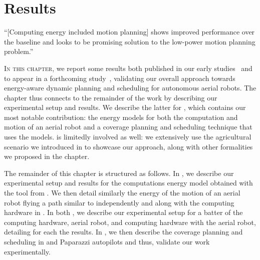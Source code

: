 
%
%
%
%
\chapter{Results}
\label{cp:res}

\begin{chapquote}{\cite{sudhakar2020balancing}}
  ``[Computing energy included motion planning] shows improved performance over the baseline and looks to be promising solution to the low-power motion planning problem.''
\end{chapquote}

\vspace*{1em}

\lettrine{I}{n this chapter}, we report some results both published in our early studies~\citep{seewald2019hlpgpu,seewald2019coarse,seewald2019component,seewald2020mechanical,zamanakos2020energy} and to appear in a forthcoming study~\citep{seewald202Xenergy}, validating our overall approach towards energy-aware dynamic planning and scheduling for autonomous aerial robots. The chapter thus connects to the remainder of the work by describing our experimental setup and results. We describe the latter for , which contains our most notable contribution: the energy models for both the computation and motion of an aerial robot and a coverage planning and scheduling technique that uses the models.  is limitedly involved as well: we extensively use the agricultural scenario we introduced in  to showcase our approach, along with other formalities we proposed in the chapter.

The remainder of this chapter is structured as follows. In , we describe our experimental setup and results for the computations energy model obtained with the \powprof{} tool from . We then detail similarly the energy of the motion of an aerial robot flying a path similar to  independently and along with the computing hardware in . In both , we describe our experimental setup for a batter of the computing hardware, aerial robot, and computing hardware with the aerial robot, detailing for each the results. In , we then describe the coverage planning and scheduling in \matlab and Paparazzi autopilots and thus, validate our work experimentally.


